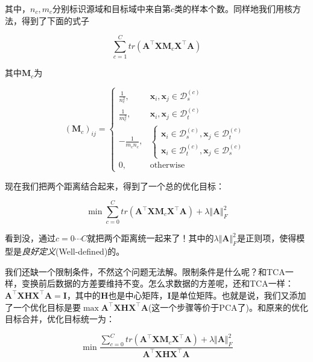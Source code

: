 其中，$n_c,m_c$分别标识源域和目标域中来自第$c$类的样本个数。同样地我们用核方法，得到了下面的式子

\begin{equation}
	\sum_{c=1}^{C}tr(\mathbf{A}^\top \mathbf{X} \mathbf{M}_c \mathbf{X}^\top \mathbf{A})
\end{equation}

其中$\mathbf{M}_c$为

\begin{equation}
	(\mathbf{M}_c)_{ij}=\begin{cases} \frac{1}{n^2_c}, & \mathbf{x}_i,\mathbf{x}_j \in \mathcal{D}^{(c)}_s\\ \frac{1}{m^2_c}, & \mathbf{x}_i,\mathbf{x}_j \in \mathcal{D}^{(c)}_t\\ -\frac{1}{m_c n_c}, & \begin{cases} \mathbf{x}_i \in \mathcal{D}^{(c)}_s ,\mathbf{x}_j \in \mathcal{D}^{(c)}_t \\ \mathbf{x}_i \in \mathcal{D}^{(c)}_t ,\mathbf{x}_j \in \mathcal{D}^{(c)}_s \end{cases}\\ 0, & \text{otherwise}\end{cases}
\end{equation}

现在我们把两个距离结合起来，得到了一个总的优化目标：

\begin{equation}
	\min \sum_{c=0}^{C}tr(\mathbf{A}^\top \mathbf{X} \mathbf{M}_c \mathbf{X}^\top \mathbf{A}) + \lambda \Vert \mathbf{A} \Vert ^2_F
\end{equation}

看到没，通过$c=0 \cdots C$就把两个距离统一起来了！其中的$\lambda \Vert \mathbf{A} \Vert ^2_F$是正则项，使得模型是\textit{良好定义}(Well-defined)的。

我们还缺一个限制条件，不然这个问题无法解。限制条件是什么呢？和TCA一样，变换前后数据的方差要维持不变。怎么求数据的方差呢，还和TCA一样：$\mathbf{A}^\top \mathbf{X} \mathbf{H} \mathbf{X}^\top \mathbf{A} = \mathbf{I}$，其中的$\mathbf{H}$也是中心矩阵，$\mathbf{I}$是单位矩阵。也就是说，我们又添加了一个优化目标是要$\max \mathbf{A}^\top \mathbf{X} \mathbf{H} \mathbf{X}^\top \mathbf{A}$(这一个步骤等价于PCA了)。和原来的优化目标合并，优化目标统一为：

\begin{equation}
	\min \frac{\sum_{c=0}^{C}tr(\mathbf{A}^\top \mathbf{X} \mathbf{M}_c \mathbf{X}^\top \mathbf{A}) + \lambda \Vert \mathbf{A}\Vert^2_F}{ \mathbf{A}^\top \mathbf{X} \mathbf{H} \mathbf{X}^\top \mathbf{A}}
\end{equation}

